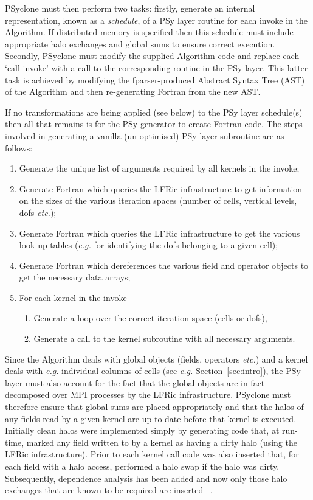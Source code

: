 \documentclass[review,times]{elsarticle}
\begin{document}
PSyclone must then perform two tasks: firstly, generate an internal
representation, known as a {\em schedule}, of a PSy layer routine for each invoke in
the Algorithm. If distributed memory is specified then this schedule
must include appropriate halo exchanges and global sums to ensure
correct execution. Secondly, PSyclone must modify the supplied Algorithm
code and replace each `call invoke' with a call to the corresponding
routine in the PSy layer. This latter task is achieved by modifying
the fparser-produced Abstract Syntax Tree (AST) of the Algorithm and
then re-generating Fortran from the new AST.

If no transformations are being applied (see below) to the PSy layer
schedule(s) then all that remains is for the PSy generator to create
Fortran code.  The steps involved in generating a vanilla
(un-optimised) PSy layer subroutine are as follows:
\begin{enumerate}
\item Generate the unique list of arguments required by all kernels
  in the invoke;
\item Generate Fortran which queries the LFRic infrastructure to get
  information on the sizes of the various iteration spaces (number of cells,
  vertical levels, dofs {\em etc.});
\item Generate Fortran which queries the LFRic infrastructure to get the
  various look-up tables ({\em e.g.} for identifying the dofs belonging to a
  given cell);
\item Generate Fortran which dereferences the various field and operator
  objects to get the necessary data arrays;
\item For each kernel in the invoke
  \begin{enumerate}
    \item Generate a loop over the correct iteration space (cells or dofs),
    \item Generate a call to the kernel subroutine with all necessary arguments.
  \end{enumerate}
\end{enumerate}

Since the Algorithm deals with global objects
(fields, operators {\em etc.})  and a kernel deals with {\em e.g.} individual
columns of cells (see {\em e.g.} Section~\ref{sec:intro}), 
the PSy layer must also account for the fact that
the global objects are in fact decomposed over MPI processes by the
LFRic infrastructure. PSyclone must therefore ensure that global sums
are placed appropriately and that the halos of any fields read by a
given kernel are up-to-date before that kernel is executed. Initially
clean halos were implemented simply by generating code that, at
run-time, marked any field written to by a kernel as having a dirty
halo (using the LFRic infrastructure). Prior to each kernel call code
was also inserted that, for each field with a halo access, performed a
halo swap if the halo was dirty. Subsequently, dependence analysis has
been added and now only those halo exchanges that are known to be
required are inserted ~\cite{psyclone}.
\end{document}
